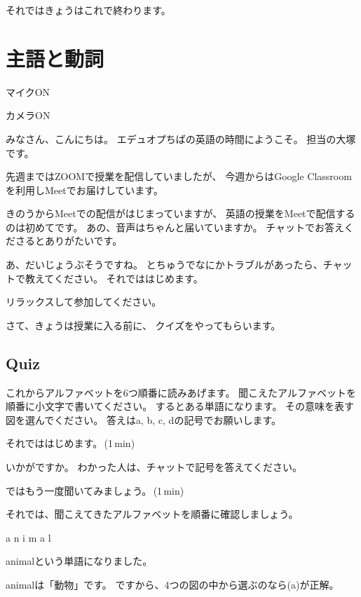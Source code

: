 \documentclass[12pt]{jlreq}
\newenvironment{my_check}
  {\begin{itemize}
    \renewcommand\labelitemi{$\square\hspace{0.5em}$}} %
  {\end{itemize}}
\begin{document}
それではきょうはこれで終わります。
\newpage
\section{主語と動詞}
\begin{my_check}
\item マイクON
\item カメラON
\end{my_check}

{\LARGE \ComputerMouse}

みなさん、こんにちは。
エデュオプちばの英語の時間にようこそ。
担当の大塚です。

先週まではZOOMで授業を配信していましたが、
今週からはGoogle Classroomを利用しMeetでお届けしています。

きのうからMeetでの配信がはじまっていますが、
英語の授業をMeetで配信するのは初めてです。
あの、音声はちゃんと届いていますか。
チャットでお答えくださるとありがたいです。

あ、だいじょうぶそうですね。
とちゅうでなにかトラブルがあったら、チャットで教えてください。
それでははじめます。

リラックスして参加してください。

さて、きょうは授業に入る前に、
クイズをやってもらいます。

{\large \ComputerMouse}

\newpage
\subsection{Quiz}

これからアルファベットを6つ順番に読みあげます。
聞こえたアルファベットを順番に小文字で書いてください。
するとある単語になります。
その意味を表す図を選んでください。
答えはa, b, c, dの記号でお願いします。


それでははじめます。\faVolumeUp\,(1\,min)

いかがですか。
わかった人は、チャットで記号を答えてください。


ではもう一度聞いてみましょう。\faVolumeUp\,(1\,min)

それでは、聞こえてきたアルファベットを順番に確認しましょう。{\large \ComputerMouse}

a
{\large \ComputerMouse}
n
{\large \ComputerMouse}
i
{\large \ComputerMouse}
m
{\large \ComputerMouse}
a
{\large \ComputerMouse}
l

animalという単語になりました。

animalは「動物」です。
ですから、4つの図の中から選ぶのなら(a)が正解。
\end{document}
